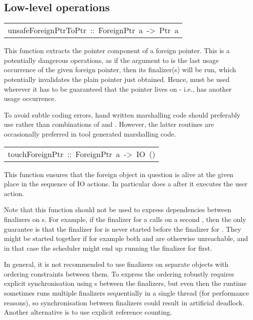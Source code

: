 \subsection{Low-level operations
}
\begin{haddockdesc}
\item[\begin{tabular}{@{}l}
unsafeForeignPtrToPtr\ ::\ ForeignPtr\ a\ ->\ Ptr\ a
\end{tabular}]\haddockbegindoc
This function extracts the pointer component of a foreign
 pointer.  This is a potentially dangerous operations, as if the
 argument to  is the last usage
 occurrence of the given foreign pointer, then its finalizer(s) will
 be run, which potentially invalidates the plain pointer just
 obtained.  Hence,  must be used
 wherever it has to be guaranteed that the pointer lives on - i.e.,
 has another usage occurrence.
\par
To avoid subtle coding errors, hand written marshalling code
 should preferably use  rather
 than combinations of  and
 .  However, the latter routines
 are occasionally preferred in tool generated marshalling code.
\par

\end{haddockdesc}
\begin{haddockdesc}
\item[\begin{tabular}{@{}l}
touchForeignPtr\ ::\ ForeignPtr\ a\ ->\ IO\ ()
\end{tabular}]\haddockbegindoc
This function ensures that the foreign object in
 question is alive at the given place in the sequence of IO
 actions. In particular 
 does a  after it
 executes the user action.
\par
Note that this function should not be used to express dependencies
 between finalizers on s.  For example, if the finalizer
 for a   calls  on a second
  , then the only guarantee is that the finalizer
 for  is never started before the finalizer for .  They
 might be started together if for example both  and  are
 otherwise unreachable, and in that case the scheduler might end up
 running the finalizer for  first.
\par
In general, it is not recommended to use finalizers on separate
 objects with ordering constraints between them.  To express the
 ordering robustly requires explicit synchronisation using s
 between the finalizers, but even then the runtime sometimes runs
 multiple finalizers sequentially in a single thread (for
 performance reasons), so synchronisation between finalizers could
 result in artificial deadlock.  Another alternative is to use
 explicit reference counting.
\par

\end{haddockdesc}
